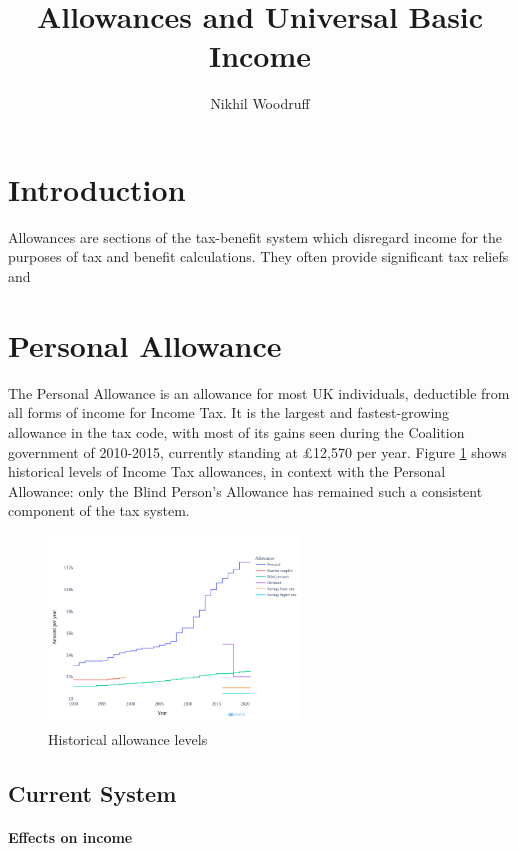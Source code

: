 \documentclass{article}
\title{Allowances and Universal Basic Income}
\author{Nikhil Woodruff}
\begin{document}
    \maketitle
    \section{Introduction}
    Allowances are sections of the tax-benefit system which disregard income for the purposes of tax and benefit calculations. They often provide significant tax reliefs and 
    \section{Personal Allowance}
    The Personal Allowance is an allowance for most UK individuals, deductible from all forms of income for Income Tax. It is the largest and fastest-growing allowance in the tax code, with most of its gains seen during the Coalition government of 2010-2015, currently standing at £12,570 per year. Figure \ref{fig:PA_hist} shows historical levels of Income Tax allowances, in context with the Personal Allowance: only the Blind Person's Allowance has remained such a consistent component of the tax system.
    \begin{figure}
        \centering
        \includegraphics[width=0.6\textwidth]{images/fig_1.png}
        \caption{Historical allowance levels}
        \label{fig:PA_hist}
    \end{figure}

    \subsection{Current System}

    \paragraph{Effects on income}
\end{document}
